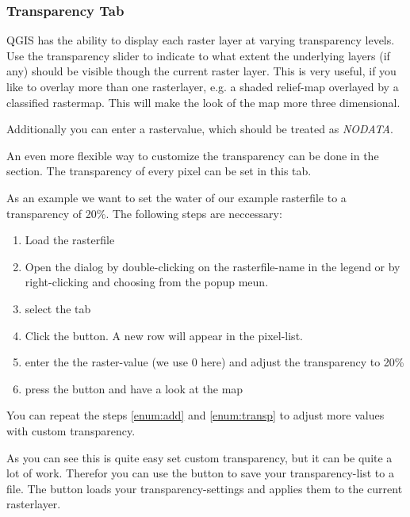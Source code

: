\subsubsection{Transparency Tab} \label{rastertab:transparency}

QGIS has the ability to display each raster layer at varying transparency
levels. Use the transparency slider to indicate to
what extent the underlying layers (if any) should be visible though the
current raster layer. 
This is very useful, if
you like to overlay more than one rasterlayer, e.g. a shaded relief-map
overlayed by a classified rastermap. This will make the look of the map
more three dimensional.

Additionally you can enter a rastervalue, which should be treated as
{\em NODATA}.

An even more flexible way to customize the transparency can be done in the
 section.
The transparency of every pixel can be set in this tab.

As an example we want to set the water of our example rasterfile
 to a transparency of 20\%. The following steps
are neccessary:
\begin{enumerate}
 \item  Load the rasterfile 
 \item Open the  dialog by double-clicking on the
 rasterfile-name in the legend or by right-clicking and choosing
  from the popup meun.
 \item select the  tab
 \item \label{enum:add} Click the 
 button. A new row will appear in the pixel-list.
 \item \label{enum:transp} enter the the raster-value (we use 0 here) and adjust the
 transparency to 20\%
 \item press the  button and have a look at the map
\end{enumerate}

You can repeat the steps \ref{enum:add} and \ref{enum:transp} to adjust
more values with custom transparency.

As you can see this is quite easy set custom transparency, but it can be
quite a lot of work. Therefor you can use the button
 to save your
transparency-list to a file. The button
 loads your
transparency-settings and applies them to the current rasterlayer.

